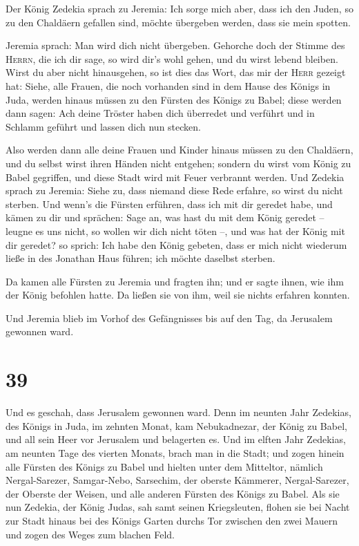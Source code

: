  Der König Zedekia sprach zu Jeremia: Ich sorge mich
aber, dass ich den Juden, so zu den Chaldäern gefallen sind, möchte
übergeben werden, dass sie mein spotten.

 Jeremia sprach: Man wird dich nicht übergeben. Gehorche
doch der Stimme des \textsc{Herrn}, die ich dir sage, so wird dir's wohl
gehen, und du wirst lebend bleiben.  Wirst du aber nicht
hinausgehen, so ist dies das Wort, das mir der \textsc{Herr} gezeigt
hat:  Siehe, alle Frauen, die noch vorhanden sind in dem
Hause des Königs in Juda, werden hinaus müssen zu den Fürsten des Königs
zu Babel; diese werden dann sagen: Ach deine Tröster haben dich
überredet und verführt und in Schlamm geführt und lassen dich nun
stecken.

 Also werden dann alle deine Frauen und Kinder hinaus
müssen zu den Chaldäern, und du selbst wirst ihren Händen nicht
entgehen; sondern du wirst vom König zu Babel gegriffen, und diese Stadt
wird mit Feuer verbrannt werden.  Und Zedekia sprach zu
Jeremia: Siehe zu, dass niemand diese Rede erfahre, so wirst du nicht
sterben.  Und wenn's die Fürsten erführen, dass ich mit
dir geredet habe, und kämen zu dir und sprächen: Sage an, was hast du
mit dem König geredet -- leugne es uns nicht, so wollen wir dich nicht
töten --, und was hat der König mit dir geredet?  so
sprich: Ich habe den König gebeten, dass er mich nicht wiederum ließe in
des Jonathan Haus führen; ich möchte daselbst sterben.

 Da kamen alle Fürsten zu Jeremia und fragten ihn; und er
sagte ihnen, wie ihm der König befohlen hatte. Da ließen sie von ihm,
weil sie nichts erfahren konnten.

 Und Jeremia blieb im Vorhof des Gefängnisses bis auf den
Tag, da Jerusalem gewonnen ward.

\hypertarget{section-38}{%
\section{39}\label{section-38}}

 Und es geschah, dass Jerusalem gewonnen ward. Denn im
neunten Jahr Zedekias, des Königs in Juda, im zehnten Monat, kam
Nebukadnezar, der König zu Babel, und all sein Heer vor Jerusalem und
belagerten es.  Und im elften Jahr Zedekias, am neunten
Tage des vierten Monats, brach man in die Stadt;  und
zogen hinein alle Fürsten des Königs zu Babel und hielten unter dem
Mitteltor, nämlich Nergal-Sarezer, Samgar-Nebo, Sarsechim, der oberste
Kämmerer, Nergal-Sarezer, der Oberste der Weisen, und alle anderen
Fürsten des Königs zu Babel.  Als sie nun Zedekia, der
König Judas, sah samt seinen Kriegsleuten, flohen sie bei Nacht zur
Stadt hinaus bei des Königs Garten durchs Tor zwischen den zwei Mauern
und zogen des Weges zum blachen Feld.

